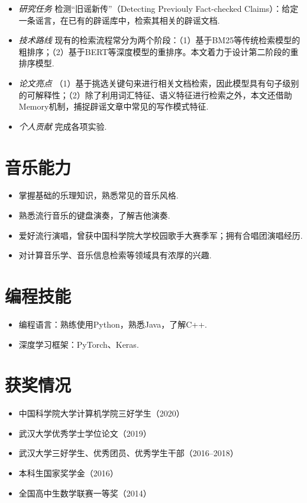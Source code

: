 \documentclass{resume}
\begin{document}
{\small {}}
\small
\begin{itemize}
  \item \textit{研究任务} \quad 检测“旧谣新传”（Detecting Previouly Fact-checked Claims）：给定一条谣言，在已有的辟谣库中，检索其相关的辟谣文档.
  \item \textit{技术路线} \quad 现有的检索流程常分为两个阶段：（1）基于BM25等传统检索模型的粗排序；（2）基于BERT等深度模型的重排序。本文着力于设计第二阶段的重排序模型.
  \item \textit{论文亮点} \quad （1）基于挑选关键句来进行相关文档检索，因此模型具有句子级别的可解释性；（2）除了利用词汇特征、语义特征进行检索之外，本文还借助Memory机制，捕捉辟谣文章中常见的写作模式特征.
  \item \textit{个人贡献} \quad 完成各项实验.
\end{itemize}

\section{音乐能力}
\small
\begin{itemize}
  \item 掌握基础的乐理知识，熟悉常见的音乐风格.
  \item 熟悉流行音乐的键盘演奏，了解吉他演奏.
  \item 爱好流行演唱，曾获中国科学院大学校园歌手大赛季军；拥有合唱团演唱经历.
  \item 对计算音乐学、音乐信息检索等领域具有浓厚的兴趣. 
\end{itemize}


\section{编程技能}
\small
\begin{itemize}
  \item 编程语言：熟练使用Python，熟悉Java，了解C++.
  \item 深度学习框架：PyTorch、Keras.
\end{itemize}

\section{获奖情况}
\begin{itemize}
  \item 中国科学院大学计算机学院三好学生（2020）
  \item 武汉大学优秀学士学位论文（2019）
  \item 武汉大学三好学生、优秀团员、优秀学生干部（2016--2018）
  \item 本科生国家奖学金（2016）
  \item 全国高中生数学联赛一等奖（2014）
\end{itemize}
\end{document}
